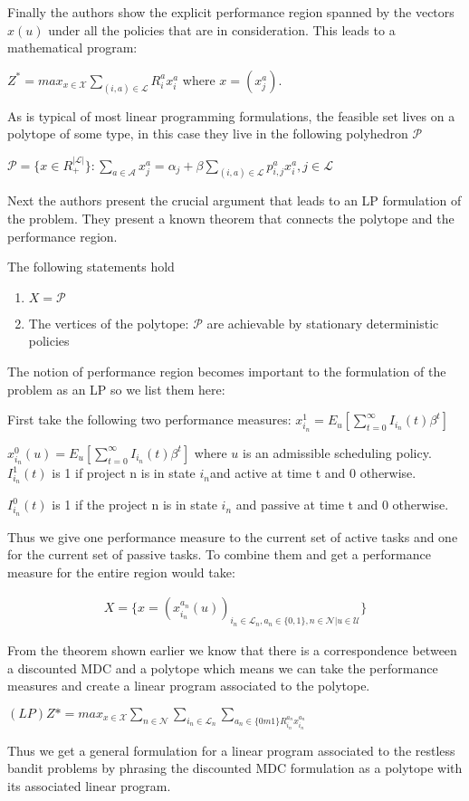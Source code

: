 Finally the authors show the explicit performance region spanned by the vectors $x(u)$ under all the policies that are in consideration. This leads to a mathematical program: 

$Z^* = max_{x \in \mathcal{X}}\sum_{(i,a)\in \mathcal{L}}R_i^a x_i^a$ where $x = (x_j^a)$. 

As is typical of most linear programming formulations, the feasible set lives on a polytope of some type, in this case they live in the following polyhedron $\mathcal {P}$ 

$\mathcal{P} = \{ x \in R_+^{|\mathcal{L}|} \}: \sum_{a \in \mathcal{A}} x_j^a = \alpha_j 
+ \beta \sum_{(i,a) \in \mathcal{L}} p_{i,j}^a x_i^a, j  \in \mathcal{L}$ 

Next the authors present the crucial argument that leads to an LP formulation of the problem.
They present a known theorem that connects the polytope and the performance region. 

The following statements hold
\begin{enumerate}
\item
 $X = \mathcal{P}$ \\
\item
  The vertices of the polytope: $\mathcal{P}$ are achievable by stationary 
deterministic policies
\end{enumerate} 

The notion of performance region becomes important to the formulation of the problem as an
LP so we list them here:

First take the following two performance measures:
$x_{i_n}^1 = E_u[\sum_{t=0}^{\infty} I_{i_n}(t)\beta^t]$ 

$x_{i_n}^0(u) = E_u[\sum_{t=0}^{\infty}I_{i_n}(t) \beta^t]$ where $u$ is an admissible scheduling policy.  \\

$I_{i_n}^1(t)$ is 1 if project n is in state $i_n$and active at time t and 0 otherwise.

$I_{i_n}^0(t)$ is 1 if the project n is in state $i_n$ and passive at time t and 0 otherwise.

Thus we give one performance measure to the current set of active tasks and one for the current set of passive tasks. To combine them and get a performance measure for the entire region would take: 

\begin{align*}
X = \{x = (x_{i_n}^{a_n}(u))_{i_n \in \mathcal{L}_n, a_n \in \{0,1\}, n \in \mathcal{N}|u \in \mathcal{U}}\}
\end{align*}

From the theorem shown earlier we know that there is a correspondence between a discounted MDC and a polytope which means we can take the performance measures and create a linear program associated to the polytope.

$(LP) Z* = max_{x \in \mathcal{X}} \sum_{n \in \mathcal{N}} \sum_{i_n \in \mathcal{L}_n} 
\sum_{a_n \in \{ 0m1\} R_{i_n}^{a_n} x_{i_n}^{a_n}} $

Thus we get a general formulation for a linear program associated to the restless bandit problems by phrasing the discounted MDC formulation as a polytope with its associated linear program. 
